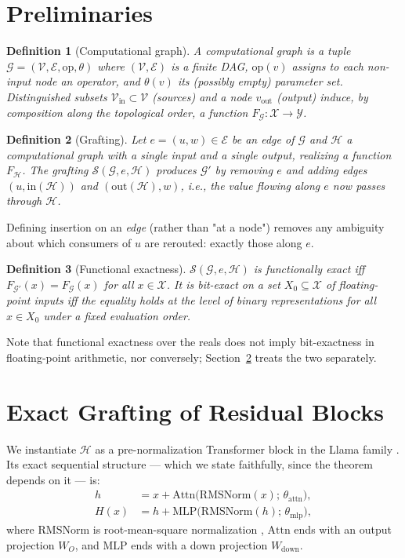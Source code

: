 \documentclass[11pt,a4paper]{article}
\newtheorem{definition}{Definition}
\newcommand{\G}{\mathcal{G}}
\newcommand{\Gp}{\mathcal{G}'}
\newcommand{\Hb}{\mathcal{H}}
\newcommand{\V}{\mathcal{V}}
\newcommand{\E}{\mathcal{E}}
\newcommand{\Surg}{\mathcal{S}}
\begin{document}
\section{Preliminaries}
\label{sec:prelim}

\begin{definition}[Computational graph]
A computational graph is a tuple $\G = (\V, \E, \mathrm{op}, \theta)$ where $(\V, \E)$ is a finite DAG, $\mathrm{op}(v)$ assigns to each non-input node an operator, and $\theta(v)$ its (possibly empty) parameter set. Distinguished subsets $\V_{\mathrm{in}} \subset \V$ (sources) and a node $v_{\mathrm{out}}$ (output) induce, by composition along the topological order, a function $F_{\G} : \mathcal{X} \to \mathcal{Y}$.
\end{definition}

\begin{definition}[Grafting]
Let $e = (u, w) \in \E$ be an edge of $\G$ and $\Hb$ a computational graph with a single input and a single output, realizing a function $F_{\Hb}$. The grafting $\Surg(\G, e, \Hb)$ produces $\Gp$ by removing $e$ and adding edges $(u, \mathrm{in}(\Hb))$ and $(\mathrm{out}(\Hb), w)$, i.e., the value flowing along $e$ now passes through $\Hb$.
\end{definition}

Defining insertion on an \emph{edge} (rather than "at a node") removes any ambiguity about which consumers of $u$ are rerouted: exactly those along $e$.

\begin{definition}[Functional exactness]
$\Surg(\G, e, \Hb)$ is \emph{functionally exact} iff $F_{\Gp}(x) = F_{\G}(x)$ for all $x \in \mathcal{X}$. It is \emph{bit-exact} on a set $X_0 \subseteq \mathcal{X}$ of floating-point inputs iff the equality holds at the level of binary representations for all $x \in X_0$ under a fixed evaluation order.
\end{definition}

Note that functional exactness over the reals does not imply bit-exactness in floating-point arithmetic, nor conversely; Section~\ref{sec:exact} treats the two separately.

\section{Exact Grafting of Residual Blocks}
\label{sec:exact}

We instantiate $\Hb$ as a pre-normalization Transformer block in the Llama family \cite{llama}. Its exact sequential structure --- which we state faithfully, since the theorem depends on it --- is:
\begin{align}
    h &= x + \mathrm{Attn}\big(\mathrm{RMSNorm}(x);\, \theta_{\mathrm{attn}}\big), \label{eq:block1}\\
    H(x) &= h + \mathrm{MLP}\big(\mathrm{RMSNorm}(h);\, \theta_{\mathrm{mlp}}\big), \label{eq:block2}
\end{align}
where $\mathrm{RMSNorm}$ is root-mean-square normalization \cite{rmsnorm}, $\mathrm{Attn}$ ends with an output projection $W_O$, and $\mathrm{MLP}$ ends with a down projection $W_{\mathrm{down}}$.
\end{document}
